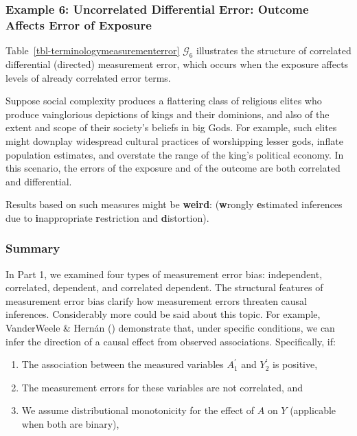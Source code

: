 \documentclass[
  single column]{article}
\providecommand{\tightlist}{%
  \setlength{\itemsep}{0pt}\setlength{\parskip}{0pt}}\usepackage{longtable,booktabs,array}
\begin{document}
\subsubsection{Example 6: Uncorrelated Differential Error: Outcome
Affects Error of
Exposure}\label{example-6-uncorrelated-differential-error-outcome-affects-error-of-exposure}

Table~\ref{tbl-terminologymeasurementerror} \(\mathcal{G}_6\)
illustrates the structure of correlated differential (directed)
measurement error, which occurs when the exposure affects levels of
already correlated error terms.

Suppose social complexity produces a flattering class of religious
elites who produce vainglorious depictions of kings and their dominions,
and also of the extent and scope of their society's beliefs in big Gods.
For example, such elites might downplay widespread cultural practices of
worshipping lesser gods, inflate population estimates, and overstate the
range of the king's political economy. In this scenario, the errors of
the exposure and of the outcome are both correlated and differential.

Results based on such measures might be \textbf{weird}:
(\textbf{w}rongly \textbf{e}stimated inferences due to
\textbf{i}nappropriate \textbf{r}estriction and \textbf{d}istortion).

\subsubsection{Summary}\label{summary}

In Part 1, we examined four types of measurement error bias:
independent, correlated, dependent, and correlated dependent. The
structural features of measurement error bias clarify how measurement
errors threaten causal inferences. Considerably more could be said about
this topic. For example, VanderWeele \& Hernán
() demonstrate that, under specific
conditions, we can infer the direction of a causal effect from observed
associations. Specifically, if:

\begin{enumerate}
\def\labelenumi{\arabic{enumi}.}
\tightlist
\item
  The association between the measured variables \(A^{\prime}_{1}\) and
  \(Y^{\prime}_{2}\) is positive,
\item
  The measurement errors for these variables are not correlated, and
\item
  We assume distributional monotonicity for the effect of \(A\) on \(Y\)
  (applicable when both are binary),
\end{enumerate}
\end{document}
